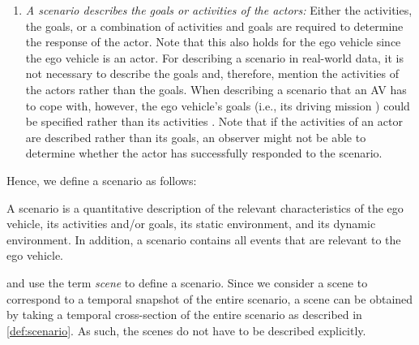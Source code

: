 \begin{enumerate}
	\item\textit{A scenario describes the goals or activities of the \cstartb actors:\cendb}
	\cstartb Either the activities, the goals, or a combination of activities and goals are required to determine the response of the actor. \cendb
	Note that this also holds for the ego vehicle since the ego vehicle is an actor.
	For describing a scenario in real-world data, it is not necessary to describe the goals and, therefore, \textcite{elrofai2016scenario} mention the activities of the \cstartb actors \cendb rather than the goals. When describing a scenario that an AV has to cope with, however, the ego vehicle's goals (i.e., its driving mission \autocite{geyer2014}) could be specified rather than its activities \autocite{ulbrich2015}. Note that if the activities of \cstartb an actor \cendb are described rather than its goals, an observer might not be able to determine whether the \cstartb actor \cendb has successfully responded to the scenario.
\end{enumerate}


Hence, we define a scenario as follows:
\begin{definition}[Scenario]\label{def:scenario}
	A scenario is a quantitative description of the relevant characteristics of the ego vehicle, its activities and/or goals, its static environment, and its dynamic environment. In addition, a scenario contains all events that are relevant to the ego vehicle.
\end{definition}


\textcite{geyer2014} and \textcite{ulbrich2015} use the term \emph{scene} to define a scenario.
\cstartb Since we consider a scene to correspond to a temporal snapshot of the entire scenario, a scene can be obtained by taking a temporal cross-section of the entire scenario as described in \cref{def:scenario}. As such\cendb, the scenes do not have to be described explicitly.



